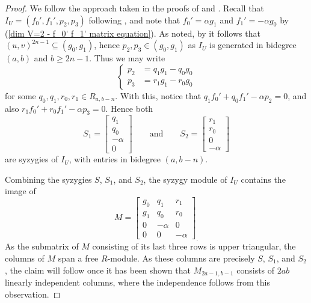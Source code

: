 \documentclass[reqno]{amsart}
\numberwithin{equation}{section}
\theoremstyle{definition}
\begin{document}
\begin{proof}
We follow the approach taken in the proofs of \cite[2.2]{DS16} and \cite[4.3]{Weaver25}. Recall that $I_U = (f_0',f_1',p_2,p_3)$ following , and note that $f_0'=\alpha g_1$ and $f_1'=-\alpha g_0$ by (\ref{dim V=2 - f_0' f_1' matrix equation}). As noted, by  it follows that $(u,v)^{2n-1}\subseteq (g_0,g_1)$, hence $p_2,p_3 \in (g_0,g_1)$ as $I_U$ is generated in bidegree $(a,b)$ and $b\geq 2n-1$. Thus we may write
\begin{equation}\label{p2,p3 decomp}
\left\{\begin{array}{rl}
     p_2 &= q_1g_1-q_0g_0  \\
     p_3 &= r_1g_1-r_0g_0 
\end{array}
\right.
\end{equation}
for some $q_0,q_1,r_0,r_1 \in R_{a,b-n}$. With this, notice that $q_1 f_0'+q_0f_1' - \alpha p_2 =0$, and also $r_1 f_0'+r_0f_1' -\alpha p_3 =0$. Hence both
\begin{equation}\label{dim V = 2 - defn of S1 and S2}
S_1=\begin{bmatrix}
    q_1\\
    q_0\\
-\alpha\\
    0
\end{bmatrix}\qquad\text{and} \qquad S_2=\begin{bmatrix}
    r_1\\
    r_0\\
0\\
    -\alpha
\end{bmatrix}
\end{equation}
are syzygies of $I_U$, with entries in bidegree $(a,b-n)$. 

Combining the syzygies $S$, $S_1$, and $S_2$, the syzygy module of $I_U$ contains the image of
\begin{equation}\label{Dim 2 M syzygy matrix}
M=\begin{bmatrix}
g_0 & q_1 & r_1\\
g_1 & q_0 & r_0\\
0 & -\alpha & 0\\
0 & 0 &-\alpha
\end{bmatrix}_.
\end{equation}
As the submatrix of $M$ consisting of its last three rows is upper triangular, the columns of $M$ span a free $R$-module. As these columns are precisely $S$, $S_1$, and $S_2$, the claim will follow once it has been shown that $M_{2a-1,b-1}$ consists of $2ab$ linearly independent columns, where the independence follows from this observation.


\end{proof}
\end{document}
